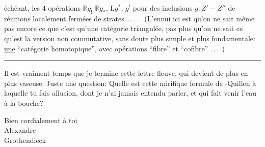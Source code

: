  échéant, les 4 opérations $\mathbb{R}g_!$ $\mathbb{R}g_*$, $\mathrm{L}g^*$, $g^!$ pour des inclusions $g:Z'-Z''$ de réunions localement fermées de strates.\,.\,.\,.\,.\,. (L'ennui ici est qu'on ne sait même pas encore ce que c'est qu'une catégorie triangulée, pas plus qu'on ne sait ce qu'est la version non commutative, sans doute plus simple et plus fondamentale: \uline{une} ``catégorie homotopique'', avec opérations ``fibre'' et ``cofibre'' .\,.\,.\,.)

\begin{center}\rule{0.41\linewidth}{0.4pt}\end{center}

Il est vraiment temps que je termine cette lettre-fleuve, qui devient de plus en plus vaseuse. Juste une question: Quelle est cette mirifique formule de -Quillen à laquelle tu fais allusion, dont je n'ai jamais entendu parler, et qui fait venir l'eau à la bouche?

Bien cordialement à toi\\
\hspace*{0.42\linewidth}Alexandre\\
\hspace*{0.52\linewidth}Grothendieck\\
